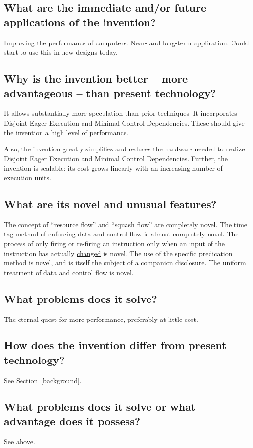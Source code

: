 \documentclass[10pt,dvips]{article}
\begin{document}
\subsection{What are the immediate and/or future applications of the invention?}
Improving the performance of computers.
Near- and long-term application. Could start to use this in new designs today.

\subsection{Why is the invention better -- more advantageous -- than present technology?}
It allows substantially more speculation than prior techniques. It incorporates
Disjoint Eager Execution and Minimal Control Dependencies. These should give the
invention a high level of performance.

Also, the invention greatly simplifies and reduces the hardware needed to realize
Disjoint Eager Execution and Minimal Control Dependencies. Further, the invention
is scalable: its cost grows linearly with an increasing number of execution
units.

\subsection{What are its novel and unusual features?}
The concept of ``resource flow'' and ``squash flow'' are completely novel.
The time tag method of enforcing data and control flow is almost completely
novel. The process of only firing or re-firing an instruction only when an input
of the instruction has actually \underline{changed} is novel. The use of
the specific predication method is novel, and is itself the subject of a
companion disclosure. The uniform treatment of data and control flow is
novel.

\subsection{What problems does it solve?}
The eternal quest for more performance, preferably at little cost.

\subsection{How does the invention differ from present technology?}
See Section~\ref{background}.

\subsection{What problems does it solve or what advantage does it possess?}
See above.
\end{document}
